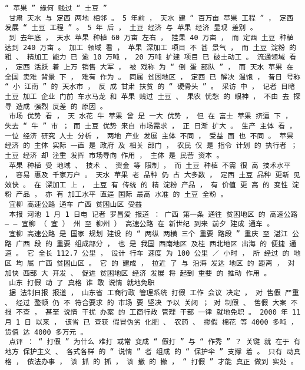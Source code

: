 \documentclass{article}
\begin{document}
\begin{Verbatim}[commandchars=\\\{\}]
 “ 苹果 ” 缘何 贱过 “ 土豆 ” 
 甘肃 天水 与 定西 两地 相邻 。 5 年前 ， 天水 建 “ 百万亩 苹果 工程 ” ， 定西 发展 “ 土豆 工程 ” 。 5 年 后 ， 土豆 经济 与 苹果 经济 显现 差别 。 
 到 去年底 ， 天水 苹果 种植 60 万亩 左右 ， 挂果 40 万亩 ， 而 定西 土豆 种植 达到 240 万亩 。 加工 领域 看 ， 苹果 深加工 项目 不 甚 景气 ， 而 土豆 淀粉 的 粗 、 精加工 能力 已 逾 10 万吨 ， 20 万吨 扩建 项目 已 破土动工 。 流通领域 看 ， 定西 活跃 着 上万 销售 大军 ， 被 戏称 为 “ 倒 蛋 部队 ” ， 而 天水 苹果 在 全国 卖难 背景 下 ， 难有 作为 。 同属 贫困地区 ， 定西 已 解决 温饱 ， 昔日 号称 “ 小 江南 ” 的 天水市 ， 反 成 甘肃 扶贫 的 “ 硬骨头 ” 。 采访 中 ， 记者 目睹 土豆 加工 企业 门前 车水马龙 和 苹果 贱过 土豆 、 果农 忧愁 的 眼神 ， 不由 去 探寻 造成 强烈 反差 的 原因 。 
 市场 优势 看 ， 天 水花 牛 苹果 曾 是 一大 优势 ， 但 在 富士 苹果 挤逼 下 ， 失去 “ 牛 ” 市 ； 而 土豆 优势 来自 市场需求 ， 正 日渐 扩大 。 生产 主体 看 ， 一位 经济 研究 人士 分析 ， 两地 产业 发展 主体 不同 ， 受益 面 也 不同 。 苹果 经济 的 主体 实际 一直 是 政府 及 相关 部门 ， 农民 仅 是 指令 计划 的 执行者 ； 土豆 经济 却 注重 发挥 市场导向 作用 ， 主体 是 民营 资本 。 
 苹果 种植 受 地域 、 技术 、 资金 等 限制 ， 而 土豆 种植 不需 很 高 技术水平 ， 容易 惠及 千家万户 。 天水 苹果 老 品种 仍 占 大多数 ， 定西 土豆 品种 更新 见效快 。 在 深加工 上 ， 土豆 有 传统 的 精 淀粉 产品 ， 有 价值 更 高 的 变性 淀粉 产品 ， 亦 有 加工水平 直逼 国际 最高 水准 的 土豆 全粉 。 
 宜柳 高速公路 通车 广西 贫困山区 受益 
 本报 河池 1 月 1 日电 记者 罗昌爱 报道 ： 广西 第一条 通往 贫困地区 的 高速公路 — — 宜柳 （ 宜 ） 州 至 柳州 ） 高速公路 在 新世纪 到来 前夕 建成 通车 。 
 宜柳 高速公路 是 国家 规划 建设 的 “ 两纵 两横 三个 重要 路段 ” 重庆 至 湛江 公路 广西 段 的 重要 组成部分 ， 也 是 我国 西南地区 及桂 西北地区 出海 的 便捷 通道 。 它 全长 112.7 公里 ， 设计 行车 速度 为 100 公里 ／ 小时 ， 所 经过 的 地区 均 属 广西 贫困山区 。 它 的 建成 ， 拉近 了 与 沿海 发达 地区 的 距离 ， 对 加快 西部 大 开发 、 促进 贫困地区 经济 发展 将 起到 重要 的 推动 作用 。 
 山东 打假 动 了 真格 谁 敢 说情 就地免职 
 据 法制日报 报道 ， 山东省 工商行政 管理系统 打假 工作 会议 决定 ， 对 售假 严重 、 经过 整顿 仍 不 符合要求 的 市场 要 坚决 予以 关闭 ； 对 制假 、 售假 大案 不报 不查 ， 甚至 说情 干扰 办案 的 工商行政 管理 干部 一律 就地免职 。 2000 年 11 月 1 日 以来 ， 该省 已 查获 假冒伪劣 化肥 、 农药 、 掺假 棉花 等 4000 多吨 ， 货值 达 4000 多万元 。 
 点评 ： “ 打假 ” 为什么 难打 或常 变成 “ 假打 ” 与 “ 作秀 ” ？ 关键 就 在于 有 地方 保护主义 、 各式各样 的 “ 说情 ” 者 组成 的 “ 保护伞 ” 支撑 着 。 只有 动真格 ， 依法办事 ， 该 抓 的 抓 ， 该 撤 的 撤 ， “ 打假 ” 才能 真正 做到 实处 。 

\end{Verbatim}
\end{document}
